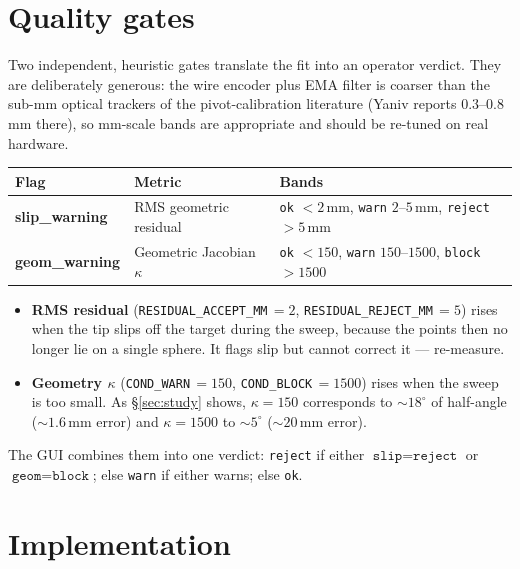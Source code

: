 \documentclass[11pt,a4paper]{article}
\begin{document}
\section{Quality gates}
\label{sec:gates}

Two independent, heuristic gates translate the fit into an operator verdict. They
are deliberately generous: the wire encoder plus EMA filter is coarser than the
sub-mm optical trackers of the pivot-calibration literature (Yaniv reports
$0.3$--$0.8$\,mm there), so mm-scale bands are appropriate and should be re-tuned on
real hardware.

\begin{center}
\begin{tabular}{@{}lll@{}}
\toprule
Flag & Metric & Bands \\
\midrule
\textbf{slip\_warning} & RMS geometric residual &
  \texttt{ok} $<2$\,mm,\;\; \texttt{warn} $2$--$5$\,mm,\;\; \texttt{reject} $>5$\,mm \\[3pt]
\textbf{geom\_warning} & Geometric Jacobian $\kappa$ &
  \texttt{ok} $<150$,\;\; \texttt{warn} $150$--$1500$,\;\; \texttt{block} $>1500$ \\
\bottomrule
\end{tabular}
\end{center}

\begin{itemize}
\item \textbf{RMS residual} (\texttt{RESIDUAL\_ACCEPT\_MM}\,$=2$,
  \texttt{RESIDUAL\_REJECT\_MM}\,$=5$) rises when the tip slips off the target during
  the sweep, because the points then no longer lie on a single sphere. It flags
  slip but cannot correct it --- re-measure.
\item \textbf{Geometry $\kappa$} (\texttt{COND\_WARN}\,$=150$,
  \texttt{COND\_BLOCK}\,$=1500$) rises when the sweep is too small. As
  \S\ref{sec:study} shows, $\kappa=150$ corresponds to $\sim\!18^\circ$ of half-angle
  ($\sim\!1.6$\,mm error) and $\kappa=1500$ to $\sim\!5^\circ$ ($\sim\!20$\,mm error).
\end{itemize}

The GUI combines them into one verdict: \texttt{reject} if either
$\texttt{slip}=\texttt{reject}$ or $\texttt{geom}=\texttt{block}$; else
\texttt{warn} if either warns; else \texttt{ok}.

\section{Implementation}
\label{sec:impl}
\end{document}
